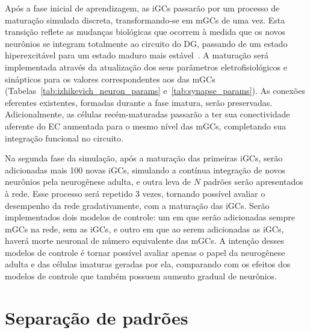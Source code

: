 Após a fase inicial de aprendizagem, as iGCs passarão por um processo de maturação simulada discreta, transformando-se em mGCs de
uma vez. Esta transição reflete as mudanças biológicas que ocorrem à medida que os novos neurônios se integram totalmente ao
circuito do DG, passando de um estado hiperexcitável para um estado maduro mais estável~\cite{abbottAdult2020}. A maturação será
implementada através da atualização dos seus parâmetros eletrofisiológicos e sinápticos para os valores correspondentes aos das
mGCs (Tabelas~\ref{tab:izhikevich_neuron_params} e~\ref{tab:synapse_params}). As conexões eferentes existentes, formadas durante a
fase imatura, serão preservadas. Adicionalmente, as células recém-maturadas passarão a ter sua conectividade aferente do EC
aumentada para o mesmo nível das mGCs, completando sua integração funcional no circuito.

Na segunda fase da simulação, após a maturação das primeiras iGCs, serão adicionadas mais 100 novas iGCs, simulando a contínua
integração de novos neurônios pela neurogênese adulta, e outra leva de $N$ padrões serão apresentados à rede. Esse processo será
repetido 3 vezes, tornando possível avaliar o desempenho da rede gradativamente, com a maturação das iGCs. Serão implementados
dois modelos de controle: um em que serão adicionadas sempre mGCs na rede, sem as iGCs, e outro em que ao serem adicionadas as
iGCs, haverá morte neuronal de número equivalente das mGCs. A intenção desses modelos de controle é tornar possível avaliar apenas
o papel da neurogênese adulta e das células imaturas geradas por ela, comparando com os efeitos dos modelos de controle que também
possuem aumento gradual de neurônios.


\section{Separação de padrões}\label{sec:separacao_padroes}

